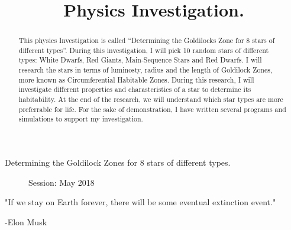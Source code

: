 \documentclass[a4paper,10pt]{article}
\title{Physics Investigation.}
\date{}
\author{}
\begin{document}
\maketitle
\begin{center}
  Determining the Goldilock Zones for 8 stars of different types.\\
\end{center}


\begin{figure}[b]
  \begin{flushleft}
    Session: May 2018\\
    \end{flushleft}
  \end{figure}

\newpage

\tableofcontents

\newpage
{}
\doublespacing

\begin{center}
  "If we stay on Earth forever, there will be some eventual extinction event." 
\end{center}
\begin{flushright}
  -Elon Musk \cite{musk}
\end{flushright}
\onehalfspacing
\begin{abstract}
  This physics Investigation is called ``Determining the Goldilocks Zone for 8 stars of different types''.
  During this investigation, I will pick 10 random stars of different types: White Dwarfs, Red Giants, Main-Sequence Stars and Red Dwarfs.
  I will research the stars in terms of luminosty, radius and the length of Goldilock Zones, more known as Circumferential Habitable Zones.
  During this research, I will investigate different properties and charasteristics of a star to determine its habitability.
  At the end of the research, we will understand which star types are more preferrable for life.
  For the sake of demonstration, I have written several programs and simulations to support my investigation. 
\end{abstract}

  
\end{document}
